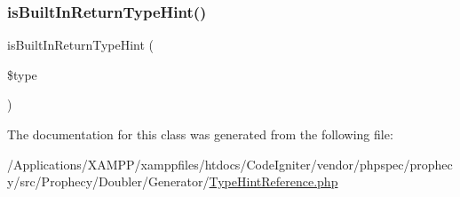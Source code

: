 \mbox{\label{class_prophecy_1_1_doubler_1_1_generator_1_1_type_hint_reference_a960caa6842a728dad06ca34a3f925272}} 
\subsubsection{\texorpdfstring{is\+Built\+In\+Return\+Type\+Hint()}{isBuiltInReturnTypeHint()}}
{\footnotesize\ttfamily is\+Built\+In\+Return\+Type\+Hint (\begin{DoxyParamCaption}\item[{}]{\$type }\end{DoxyParamCaption})}



The documentation for this class was generated from the following file\+:\begin{DoxyCompactItemize}
\item 
/\+Applications/\+X\+A\+M\+P\+P/xamppfiles/htdocs/\+Code\+Igniter/vendor/phpspec/prophecy/src/\+Prophecy/\+Doubler/\+Generator/\mbox{\hyperlink{_type_hint_reference_8php}{Type\+Hint\+Reference.\+php}}\end{DoxyCompactItemize}
